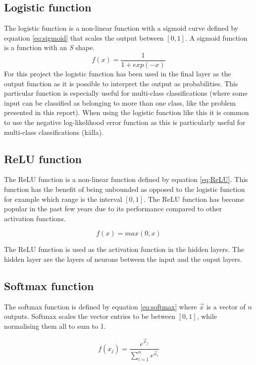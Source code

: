 \subsection{Logistic function}
The logistic function is a non-linear function with a sigmoid curve defined by equation \ref{eq:sigmoid} that scales the output between $[0, 1]$. A sigmoid function is a function with an \textit{S} shape.
\begin{equation}\label{eq:sigmoid}
    f(x)=\frac{1}{1+exp(-x)}
\end{equation}
For this project the logistic function has been used in the final layer as the output function as it is possible to interpret the output as probabilities. This particular function is especially useful for multi-class classifications (where some input can be classified as belonging to more than one class, like the problem presented in this report). When using the logistic function like this it is common to use the negative log-likelihood error function as this is particularly useful for multi-class classifications (källa).

\subsection{ReLU function}
The ReLU function is a non-linear function defined by equation \ref{eq:ReLU}. This function has the benefit of being unbounded as opposed to the logistic function for example which range is the interval $[0, 1]$. The ReLU function has become popular in the past few years due to its performance compared to other activation functions. \parencite{glorot2011deep}

\begin{equation}\label{eq:ReLU}
    f(x) = max(0,x)
\end{equation}

The ReLU function is used as the activation function in the hidden layers. The hidden layer are the layers of neurons between the input and the ouput layers.
\subsection{Softmax function}
The softmax function is defined by equation \ref{eq:softmax} where $\vec{x}$ is a vector of $n$ outputs. Softmax scales the vector entries to be between $[0,1]$, while normalising them all to sum to 1.

\begin{equation} \label{eq:softmax}
    f(x_j) = \frac{e^{\vec{x}_j}}{\sum_{i=1}^{n} e^{\vec{x}_i}}
\end{equation}

